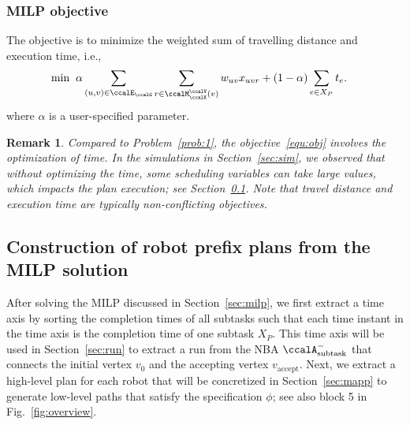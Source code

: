 \documentclass[Afour,sageh,times]{sagej}
\newtheorem{rem}[thm]{Remark}
\newcommand{\auto}[1]{\ccalA_{\text{#1}}}
\begin{document}
{{\subsubsection{MILP objective}The objective is to minimize the weighted sum of travelling distance and execution time, i.e.,
\begingroup\makeatletter\def\f@size{10}\check@mathfonts
\def\maketag@@@#1{\hbox{\m@th\normalsize\normalfont#1}}%
\begin{align}\label{equ:obj}
  \min \; \;&  \alpha \sum_{(u,v)\in \ccalE_\ccalG}  \sum_{r \in \ccalM^\ccalV_{\ccalK}(v)} w_{uv} x_{uvr} +  (1 - \alpha) \sum_{e\in X_P} t_e .
\end{align}
 \endgroup
  where $\alpha$ is a user-specified parameter.
  \begin{rem}
   Compared to Problem~\ref{prob:1}, the objective~\eqref{equ:obj} involves the optimization of time. In the simulations in Section~\ref{sec:sim}, we observed that without optimizing the time, some scheduling variables can take large values, which impacts the plan execution; see Section~\ref{sec:path}. Note that travel distance and execution time are typically non-conflicting objectives.

  \end{rem}
\subsection{Construction of robot prefix plans from the MILP solution}\label{sec:path}
After solving the MILP discussed in Section~\ref{sec:milp}, we first extract a time axis by sorting the completion times of all subtasks such that each time instant in the time axis is the completion time of one subtask $X_P$. This time axis  will be used in Section~\ref{sec:run} to extract a run from the NBA $\auto{subtask}^-$ that connects the initial vertex $v_0$ and the accepting vertex $v_\text{accept}$. Next, we extract a high-level plan for each robot  that will be concretized in Section~\ref{sec:mapp} to generate low-level paths that satisfy the specification $\phi$; see also block 5 in Fig.~\ref{fig:overview}.


}}
\end{document}
